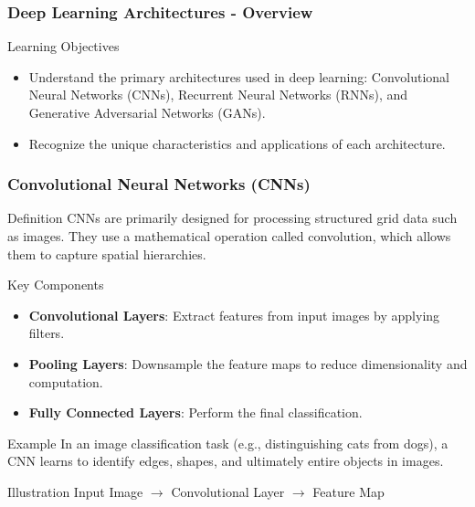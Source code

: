 \documentclass[aspectratio=169]{beamer}
\begin{document}
\begin{frame}[fragile]
    \frametitle{Deep Learning Architectures - Overview}
    \begin{block}{Learning Objectives}
        \begin{itemize}
            \item Understand the primary architectures used in deep learning: 
                Convolutional Neural Networks (CNNs), Recurrent Neural Networks (RNNs), and Generative Adversarial Networks (GANs).
            \item Recognize the unique characteristics and applications of each architecture.
        \end{itemize}
    \end{block}
\end{frame}

\begin{frame}[fragile]
    \frametitle{Convolutional Neural Networks (CNNs)}
    \begin{block}{Definition}
        CNNs are primarily designed for processing structured grid data such as images. 
        They use a mathematical operation called convolution, which allows them to capture spatial hierarchies.
    \end{block}
    
    \begin{block}{Key Components}
        \begin{itemize}
            \item \textbf{Convolutional Layers}: Extract features from input images by applying filters.
            \item \textbf{Pooling Layers}: Downsample the feature maps to reduce dimensionality and computation.
            \item \textbf{Fully Connected Layers}: Perform the final classification.
        \end{itemize}
    \end{block}

    \begin{block}{Example}
        In an image classification task (e.g., distinguishing cats from dogs), a CNN learns to identify edges, shapes, and ultimately entire objects in images.
    \end{block}

    \begin{block}{Illustration}
        Input Image $\rightarrow$ Convolutional Layer $\rightarrow$ Feature Map
    \end{block}
\end{frame}
\end{document}

